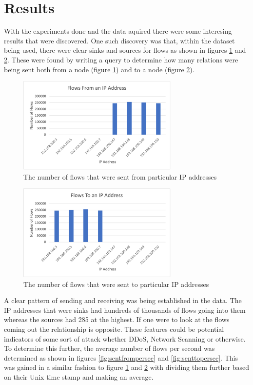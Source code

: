 \documentclass[conference]{IEEEtran}
\begin{document}
\section{Results}

With the experiments done and the data aquired there were some interesing results that were discovered. One such
discovery was that, within the dataset being used, there were clear sinks and sources for flows as shown in figures
\ref{fig:flowfrom} and \ref{fig:flowto}. These were found by writing a query to determine how many relations were 
being sent both from a node (figure \ref{fig:flowfrom}) and to a node (figure \ref{fig:flowto}).

\begin{figure}[htbp]
    \includegraphics[width=8cm]{Figure1.png}
    \centering
    \caption{The number of flows that were sent from particular IP addresses}
    \label{fig:flowfrom}
\end{figure}

\begin{figure}[htbp]
    \includegraphics[width=8cm]{Figure2.png}
    \centering
    \caption{The number of flows that were sent to particular IP addresses}
    \label{fig:flowto}
\end{figure}

A clear pattern of sending and receiving was being established in the data. The IP addresses that were sinks had hundreds of thousands
of flows going into them whereas the sources had 285 at the highest. If one were to look at the flows coming out the
relationship is opposite. These features could be potential indicators of some sort of attack whether DDoS,
Network Scanning or otherwise. To determine this further, the average number of flows per second was determined as
shown in figures \ref{fig:sentfrompersec} and \ref{fig:senttopersec}. This was gained in a similar fashion to figure 
\ref{fig:flowfrom} and \ref{fig:flowto} with dividing them further based on their Unix time stamp and making an average.
\end{document}

